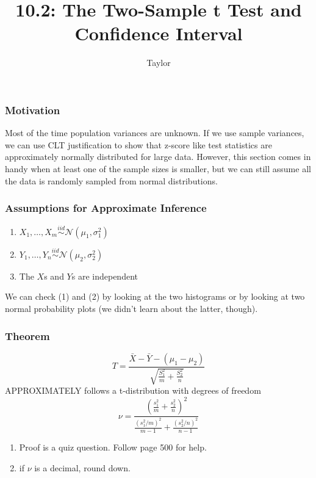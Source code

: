 \documentclass{beamer}
\title["10.2"]{10.2: The Two-Sample t Test and Confidence Interval}
\author{Taylor}
\institute[UVA] 
{
University of Virginia \\
\medskip
\textit{} 
}
\date{}
\begin{document}

\begin{frame}
\titlepage 
\end{frame}
\begin{frame}
\frametitle{Motivation}

Most of the time population variances are unknown. If we use sample variances, we can use CLT justification to show that z-score like test statistics are approximately normally distributed for large data. However, this section comes in handy when at least one of the sample sizes is smaller, but we can still assume all the data is randomly sampled from normal distributions.

\end{frame}
\begin{frame}
\frametitle{Assumptions for Approximate Inference}

\begin{enumerate}
\item $X_1, \ldots, X_m \overset{iid}{\sim} \mathcal{N}(\mu_1, \sigma_1^2)$
\item $Y_1, \ldots, Y_n \overset{iid}{\sim} \mathcal{N}(\mu_2, \sigma_2^2)$
\item The $X$s and $Y$s are independent
\end{enumerate}

We can check (1) and (2) by looking at the two histograms or by looking at two normal probability plots (we didn't learn about the latter, though).
\end{frame}
\begin{frame}
\frametitle{Theorem}

\[
T = \frac{\bar{X} - \bar{Y} - (\mu_1 - \mu_2)}{\sqrt{\frac{S_1^2}{m} + \frac{S_2^2}{n}} }
\]
APPROXIMATELY follows a t-distribution with degrees of freedom 
\[
\nu = \frac{\left(\frac{s_1^2}{m} + \frac{s_2^2}{n}\right)^2 }{\frac{(s_1^2/m)^2}{m-1} + \frac{(s_2^2/n)^2}{n-1} }
\]

\begin{enumerate}
\item Proof is a quiz question. Follow page 500 for help.
\item if $\nu$ is a decimal, round down.
\end{enumerate}

\end{frame}
\end{document}
